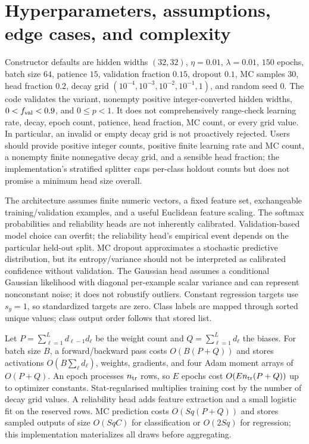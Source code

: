 \documentclass[conference]{IEEEtran}
\begin{document}
\section{Hyperparameters, assumptions, edge cases, and complexity}
Constructor defaults are hidden widths $(32,32)$, $\eta=0.01$, $\lambda=0.01$, $150$ epochs, batch size $64$, patience $15$, validation fraction $0.15$, dropout $0.1$, MC samples $30$, head fraction $0.2$, decay grid $(10^{-4},10^{-3},10^{-2},10^{-1},1)$, and random seed $0$. The code validates the variant, nonempty positive integer-converted hidden widths, $0<f_{\rm val}<0.9$, and $0\leq p<1$. It does not comprehensively range-check learning rate, decay, epoch count, patience, head fraction, MC count, or every grid value. In particular, an invalid or empty decay grid is not proactively rejected. Users should provide positive integer counts, positive finite learning rate and MC count, a nonempty finite nonnegative decay grid, and a sensible head fraction; the implementation's stratified splitter caps per-class holdout counts but does not promise a minimum head size overall.

The architecture assumes finite numeric vectors, a fixed feature set, exchangeable training/validation examples, and a useful Euclidean feature scaling. The softmax probabilities and reliability heads are not inherently calibrated. Validation-based model choice can overfit; the reliability head's empirical event depends on the particular held-out split. MC dropout approximates a stochastic predictive distribution, but its entropy/variance should not be interpreted as calibrated confidence without validation. The Gaussian head assumes a conditional Gaussian likelihood with diagonal per-example scalar variance and can represent nonconstant noise; it does not robustify outliers. Constant regression targets use $s_y=1$, so standardized targets are zero. Class labels are mapped through sorted unique values; class output order follows that stored list.

Let $P=\sum_{\ell=1}^L d_{\ell-1}d_\ell$ be the weight count and $Q=\sum_{\ell=1}^Ld_\ell$ the biases. For batch size $B$, a forward/backward pass costs $O(B(P+Q))$ and stores activations $O(B\sum_\ell d_\ell)$, weights, gradients, and four Adam moment arrays of $O(P+Q)$. An epoch processes $n_{\rm tr}$ rows, so $E$ epochs cost $O(E n_{\rm tr}(P+Q))$ up to optimizer constants. Stat-regularised multiplies training cost by the number of decay grid values. A reliability head adds feature extraction and a small logistic fit on the reserved rows. MC prediction costs $O(Sq(P+Q))$ and stores sampled outputs of size $O(SqC)$ for classification or $O(2Sq)$ for regression; this implementation materializes all draws before aggregating.
\end{document}
